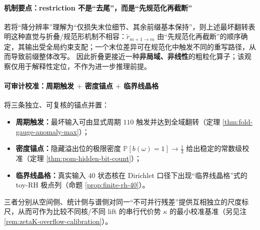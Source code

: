 \paragraph{机制要点：restriction 不是“去尾”，而是“先规范化再截断”}
若将“降分辨率”理解为“仅损失末位细节、其余前缀基本保持”，则上述最坏翻转表明这种直觉与折叠/规范形机制不相容：\(\widetilde r_{m+1\to m}\) 由“先规范化再截断”的顺序确定，其输出受全局约束支配；一个末位差异可在规范化中触发不同的重写路径，从而导致前缀整体改写。
因此折叠更接近一种\textbf{非局域、非线性}的粗粒化算子；该观察仅用于解释性定位，不作为进一步推理前提。

\paragraph{可审计校准：周期触发 \texorpdfstring{$+$}{+} 密度锚点 \texorpdfstring{$+$}{+} 临界线晶格}
将三条独立、可复核的锚点并置：
\begin{itemize}
  \item \textbf{周期触发：}最坏输入可由显式周期 \(110\) 触发并达到全域翻转（定理 \ref{thm:fold-gauge-anomaly-max}）；
  \item \textbf{密度锚点：}隐藏溢出位的极限密度 \(\mathbb{P}[b(\omega)=1]\to \frac13\) 给出稳定的常数级校准（定理 \ref{thm:pom-hidden-bit-count}）；
  \item \textbf{临界线晶格：}真实输入 \(40\) 状态核在 Dirichlet 口径下出现“临界线晶格”式的 toy-RH 极点列（命题 \ref{prop:finite-rh-40}）。
\end{itemize}
三者分别从空间侧、统计侧与谱侧对同一“不可并行残差”提供互相独立的尺度标尺，从而可作为比较不同核/不同 lift 的串行代价势 \(\kappa\) 的最小校准基准（另见注 \ref{rem:zetaK-overflow-calibration}）。

